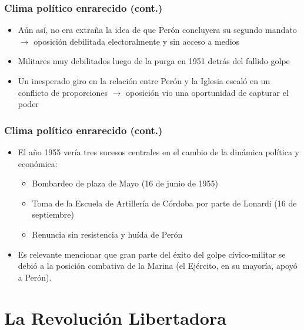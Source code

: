 \documentclass[14pt,aspectratio=169]{beamer}
\begin{document}
 \begin{frame}\frametitle{Clima político enrarecido (cont.)}
    \begin{itemize}\itemsep 10pt
      \item Aún así, no era extraña la idea de que Perón concluyera su
        segundo mandato $\longrightarrow$ oposición debilitada
        electoralmente y sin acceso a medios
        \item Militares muy debilitados luego de la purga en 1951
          detrás del fallido golpe
          \item Un inesperado giro en la relación entre Perón y la
            Iglesia escaló en un conflicto de proporciones
            $\longrightarrow$ oposición vio una oportunidad de
            capturar el poder
                             \end{itemize}
               \end{frame}

               \begin{frame}\frametitle{Clima político enrarecido (cont.)}
    \begin{itemize}\itemsep 10pt
      \item El año 1955 vería tres sucesos centrales en el cambio de
        la dinámica política y económica:
        \begin{itemize}\itemsep 5pt \medskip
        \item Bombardeo de plaza de Mayo (16 de junio de 1955)
          \item Toma de la Escuela de Artillería de Córdoba por parte
            de Lonardi (16 de
            septiembre)
            \item Renuncia sin resistencia y huída de Perón
          \end{itemize}
          \item Es relevante mencionar que gran parte del éxito del
            golpe cívico-militar se debió a la posición combativa de
            la Marina (el Ejército, en su mayoría, apoyó a Perón). 
                             \end{itemize}
               \end{frame}


\section{La Revolución Libertadora}
               
\end{document}
